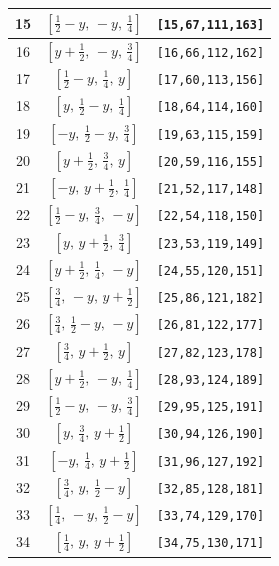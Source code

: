 \documentclass[fleqn,8pt]{jsarticle}
\begin{document}
\begin{longtable}{ccc}
15 & $\left[ \frac{1}{2} - y,\, - y,\, \frac{1}{4} \right]$ & {\tt [15,67,111,163]} \\ \hline
16 & $\left[ y + \frac{1}{2},\, - y,\, \frac{3}{4} \right]$ & {\tt [16,66,112,162]} \\ \hline
17 & $\left[ \frac{1}{2} - y,\, \frac{1}{4},\, y \right]$ & {\tt [17,60,113,156]} \\ \hline
18 & $\left[ y,\, \frac{1}{2} - y,\, \frac{1}{4} \right]$ & {\tt [18,64,114,160]} \\ \hline
19 & $\left[ - y,\, \frac{1}{2} - y,\, \frac{3}{4} \right]$ & {\tt [19,63,115,159]} \\ \hline
20 & $\left[ y + \frac{1}{2},\, \frac{3}{4},\, y \right]$ & {\tt [20,59,116,155]} \\ \hline
21 & $\left[ - y,\, y + \frac{1}{2},\, \frac{1}{4} \right]$ & {\tt [21,52,117,148]} \\ \hline
22 & $\left[ \frac{1}{2} - y,\, \frac{3}{4},\, - y \right]$ & {\tt [22,54,118,150]} \\ \hline
23 & $\left[ y,\, y + \frac{1}{2},\, \frac{3}{4} \right]$ & {\tt [23,53,119,149]} \\ \hline
24 & $\left[ y + \frac{1}{2},\, \frac{1}{4},\, - y \right]$ & {\tt [24,55,120,151]} \\ \hline
25 & $\left[ \frac{3}{4},\, - y,\, y + \frac{1}{2} \right]$ & {\tt [25,86,121,182]} \\ \hline
26 & $\left[ \frac{3}{4},\, \frac{1}{2} - y,\, - y \right]$ & {\tt [26,81,122,177]} \\ \hline
27 & $\left[ \frac{3}{4},\, y + \frac{1}{2},\, y \right]$ & {\tt [27,82,123,178]} \\ \hline
28 & $\left[ y + \frac{1}{2},\, - y,\, \frac{1}{4} \right]$ & {\tt [28,93,124,189]} \\ \hline
29 & $\left[ \frac{1}{2} - y,\, - y,\, \frac{3}{4} \right]$ & {\tt [29,95,125,191]} \\ \hline
30 & $\left[ y,\, \frac{3}{4},\, y + \frac{1}{2} \right]$ & {\tt [30,94,126,190]} \\ \hline
31 & $\left[ - y,\, \frac{1}{4},\, y + \frac{1}{2} \right]$ & {\tt [31,96,127,192]} \\ \hline
32 & $\left[ \frac{3}{4},\, y,\, \frac{1}{2} - y \right]$ & {\tt [32,85,128,181]} \\ \hline
33 & $\left[ \frac{1}{4},\, - y,\, \frac{1}{2} - y \right]$ & {\tt [33,74,129,170]} \\ \hline
34 & $\left[ \frac{1}{4},\, y,\, y + \frac{1}{2} \right]$ & {\tt [34,75,130,171]} \\ \hline

\end{longtable}
\end{document}
